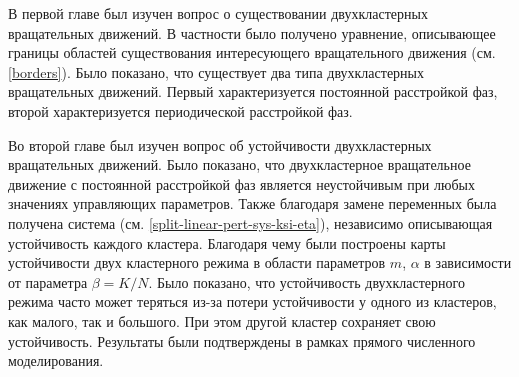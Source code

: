 В первой главе был изучен вопрос о существовании двухкластерных
вращательных движений. В частности было получено уравнение,
описывающее границы областей существования интересующего вращательного 
движения (см. \ref{borders}). Было показано, что существует два типа
двухкластерных вращательных движений. Первый характеризуется постоянной
расстройкой фаз, второй характеризуется периодической расстройкой фаз.


Во второй главе был изучен вопрос об устойчивости двухкластерных
вращательных движений. Было показано, что двухкластерное вращательное
движение с постоянной расстройкой фаз является неустойчивым при любых значениях
управляющих параметров. Также благодаря замене переменных была получена система (см. \ref{split-linear-pert-sys-ksi-eta}),
независимо описывающая устойчивость каждого кластера. Благодаря чему были построены карты
устойчивости двух кластерного режима в области параметров $m$, $\alpha$ в зависимости от
параметра $\beta = K/N$. Было показано, что устойчивость
двухкластерного режима часто может теряться из-за потери устойчивости
у одного из кластеров, как малого, так и большого. При этом другой кластер
сохраняет свою устойчивость. Результаты были подтверждены в рамках прямого
численного моделирования.
